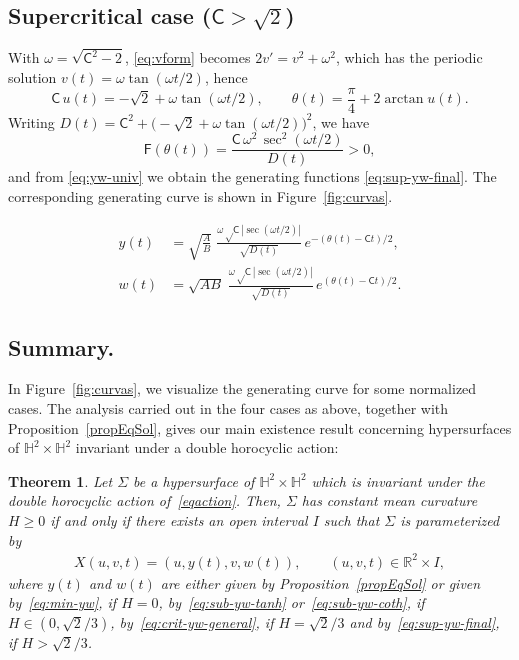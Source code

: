 \documentclass[11pt,a4paper]{amsart}
\renewcommand{\S}{\Sigma}
\theoremstyle{plain}
\newtheorem{theorem}{Theorem}[section]
\theoremstyle{remark}
\newcommand{\R}{\mathbb{R}}
\newcommand{\Hyp}{\mathbb{H}}
\newcommand{\C}{\mathsf{C}}
\newcommand{\F}{\mathsf{F}}
\begin{document}
\subsection{Supercritical case ($\C>\sqrt2$)}
\label{subsec:supercritico}

With $\omega=\sqrt{\C^2-2}$, \eqref{eq:vform} becomes $2v'=v^2+\omega^2$, 
which has the periodic solution $v(t)=\omega\tan(\omega t/2)$, hence
\begin{equation}\label{eq:sup-u}
\C\,u(t)=-\sqrt2+\omega\tan(\omega t/2),
\qquad
\theta(t)=\frac\pi4+2\arctan u(t).
\end{equation}
Writing $D(t)=\C^2+\big(-\sqrt2+\omega\tan(\omega t/2)\big)^2$, we have
\begin{equation}\label{eq:sup-F}
\F(\theta(t))=\frac{\C\,\omega^2\,\sec^2(\omega t/2)}{D(t)}>0,
\end{equation}
and from \eqref{eq:yw-univ} we obtain the generating functions
\eqref{eq:sup-yw-final}. The corresponding generating curve is shown in
Figure~\ref{fig:curvas}.

\begin{equation}\label{eq:sup-yw-final}
\boxed{\;
\begin{aligned}
y(t)&=\sqrt{\frac AB}\;\frac{\omega\sqrt\C\,|\!\sec(\omega t/2)|}{\sqrt{D(t)}}\,
       e^{-(\theta(t)-\C t)/2},\\[2pt]
w(t)&=\sqrt{AB}\;\frac{\omega\sqrt\C\,|\!\sec(\omega t/2)|}{\sqrt{D(t)}}\,
       e^{(\theta(t)-\C t)/2}.
\end{aligned}
\;}
\end{equation}

\subsection{Summary.}

In Figure~\ref{fig:curvas}, we visualize the generating
curve for some normalized cases. 
The analysis carried out in the four cases as above,
together with Proposition~\ref{propEqSol}, 
gives our main existence result concerning
hypersurfaces of $\Hyp^2\times\Hyp^2$ invariant under 
a double horocyclic action:




\begin{theorem}\label{mainThm}
Let $\S$ be a hypersurface of $\Hyp^2\times\Hyp^2$ which is invariant under the
double horocyclic action of~\eqref{eqaction}. Then, $\S$ has 
constant mean curvature $H\geq 0$
if and only if there exists an open interval $I$
such that $\S$ is parameterized by 
\begin{align*}
X(u,v,t) = (u,y(t),v,w(t)),\qquad (u,v,t)\in \R^2\times I,
\end{align*}
where $y(t)$ and $w(t)$ are either given by Proposition~\ref{propEqSol}
or given by~\eqref{eq:min-yw}, if $H = 0$,
by~\eqref{eq:sub-yw-tanh} or~\eqref{eq:sub-yw-coth}, if $H\in (0,\sqrt{2}/3)$, by~\eqref{eq:crit-yw-general}, if $H = \sqrt{2}/3$
and by~\eqref{eq:sup-yw-final}, if $H >\sqrt{2}/3$.
\end{theorem}
\end{document}
